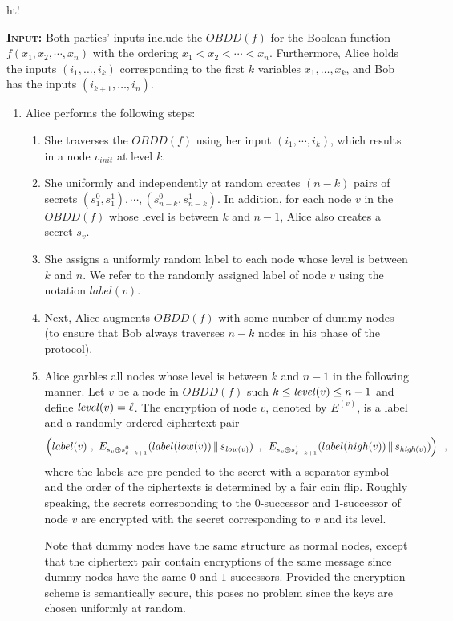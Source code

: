 \begin{center}
\begin{boxfig*}{ht!}{
\textsc{\bf Input:} Both parties' inputs include the $OBDD(f)$ for the Boolean function
$f(x_1,x_2,\cdots,x_n)$ with the ordering $x_1 < x_2 < \cdots < x_n$.
Furthermore, Alice holds the inputs $(i_1,\ldots,i_k)$ corresponding
to the first $k$ variables $x_1,\ldots,x_k$, and Bob has the inputs
$(i_{k+1},\ldots,i_n)$. 
\vspace{1ex}
\begin{enumerate}
\item Alice performs the following steps:
\begin{enumerate}
\item She traverses the $OBDD(f)$ using her
input $(i_1,\cdots,i_k)$, which results in a node $v_{init}$ at level
$k$.

\item She uniformly and independently at random creates $(n-k)$ pairs
of secrets $(s_1^0,s_1^1),\cdots,(s_{n-k}^0,s_{n-k}^1)$.  In addition,
for each node $v$ in the $OBDD(f)$ whose level is between $k$ and $n-1$,
Alice also creates a secret $s_v$. 

\item She assigns a uniformly random label to each node whose level is
between $k$ and $n$. We refer to the randomly assigned label of node
$v$ using the notation $label(v)$.

\item Next, Alice augments $OBDD(f)$ with some number of dummy nodes
(to ensure that Bob always traverses $n-k$ nodes in his phase of the protocol). 


\item Alice garbles all nodes whose level is between $k$ and $n-1$
in the following manner. Let $v$ be a node in $OBDD(f)$ such $k \leq
{\it level}(v) \leq n-1$ and define ${\it level}(v)=\ell$. The encryption of node $v$, denoted
by $E^{(v)}$, is a label and a randomly ordered ciphertext pair
\[
\left(label(v)\,\,,\,\,E_{s_v \oplus s_{\ell-k+1}^0} (label(low(v)) \,\|\, s_{{\it low}(v)})\,\,\,,\,\,\,
E_{s_v \oplus s_{\ell-k+1}^1} (label(high(v)) \,\|\, s_{{\it high}(v)})\right)\,\,\,,
\]
where the labels are pre-pended to the secret with a separator symbol
and the order of the ciphertexts is determined by a fair coin
flip. Roughly speaking, the secrets corresponding to the $0$-successor
and $1$-successor of node $v$ are encrypted with the secret
corresponding to $v$ and its level.

Note that dummy nodes have the same structure as normal nodes, except
that the ciphertext pair contain encryptions of the same message since
dummy nodes have the same $0$ and $1$-successors. Provided the
encryption scheme is semantically secure, this poses no problem since
the keys are chosen uniformly at random.


\end{enumerate}
\end{enumerate}}
\end{boxfig*}
\end{center}
